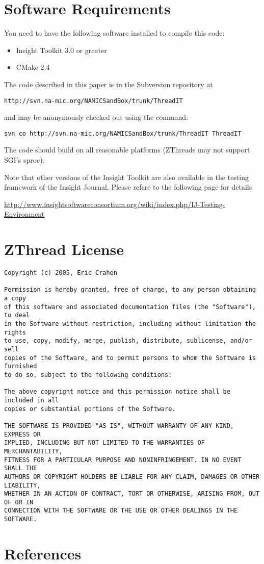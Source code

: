 \documentclass{InsightArticle}
\begin{document}
\section{Software Requirements}

You need to have the following software installed to compile this code:

\begin{itemize}
  \item  Insight Toolkit 3.0 or greater
  \item  CMake 2.4
\end{itemize}

The code described in this paper is in the Subversion repository at 
\begin{verbatim}
http://svn.na-mic.org/NAMICSandBox/trunk/ThreadIT
\end{verbatim}
and may be anonymously checked out using the command:
\begin{verbatim}
svn co http://svn.na-mic.org/NAMICSandBox/trunk/ThreadIT ThreadIT
\end{verbatim}
The code should build on all reasonable platforms (ZThreads may not support SGI's sproc).

Note that other versions of the Insight Toolkit are also available in the
testing framework of the Insight Journal. Please refere to the following page
for details

\url{http://www.insightsoftwareconsortium.org/wiki/index.php/IJ-Testing-Environment}

\section{ZThread License}

\begin{verbatim}
Copyright (c) 2005, Eric Crahen

Permission is hereby granted, free of charge, to any person obtaining a copy
of this software and associated documentation files (the "Software"), to deal
in the Software without restriction, including without limitation the rights
to use, copy, modify, merge, publish, distribute, sublicense, and/or sell
copies of the Software, and to permit persons to whom the Software is furnished
to do so, subject to the following conditions:

The above copyright notice and this permission notice shall be included in all
copies or substantial portions of the Software.

THE SOFTWARE IS PROVIDED "AS IS", WITHOUT WARRANTY OF ANY KIND, EXPRESS OR
IMPLIED, INCLUDING BUT NOT LIMITED TO THE WARRANTIES OF MERCHANTABILITY,
FITNESS FOR A PARTICULAR PURPOSE AND NONINFRINGEMENT. IN NO EVENT SHALL THE
AUTHORS OR COPYRIGHT HOLDERS BE LIABLE FOR ANY CLAIM, DAMAGES OR OTHER LIABILITY,
WHETHER IN AN ACTION OF CONTRACT, TORT OR OTHERWISE, ARISING FROM, OUT OF OR IN
CONNECTION WITH THE SOFTWARE OR THE USE OR OTHER DEALINGS IN THE SOFTWARE.

\end{verbatim}

\section*{References}


\end{document}

